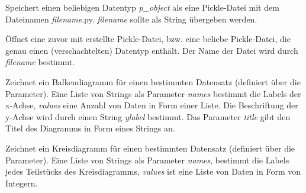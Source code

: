 \documentclass[letterpaper,10pt,english]{sphinxmanual}
\begin{document}
\begin{fulllineitems}
\label{project_3:project_3.save_as_pickle}
Speichert einen beliebigen Datentyp \emph{p\_object} als eine Pickle-Datei mit dem Dateinamen \emph{filename}.py. \emph{filename} sollte als String übergeben werden.

\end{fulllineitems}


\begin{fulllineitems}
\label{project_3:project_3.open_from_pickle}
Öffnet eine zuvor mit {\hyperref[project_3:project_3.save_as_pickle]{}} erstellte Pickle-Datei, bzw. eine beliebe Pickle-Datei, die genau einen (verschachtelten) Datentyp enthält. Der Name der Datei wird durch \emph{filename} bestimmt.

\end{fulllineitems}


\begin{fulllineitems}
\label{project_3:project_3.draw_barchart}
Zeichnet ein Balkendiagramm für einen bestimmten Datensatz (definiert über die Parameter).
Eine Liste von Strings als Parameter \emph{names} bestimmt die Labels der x-Achse, \emph{values} eine Anzahl von Daten in Form einer Liste. Die Beschriftung der y-Achse wird durch einen String \emph{ylabel} bestimmt. Das Parameter \emph{title} gibt den Titel des Diagramms in Form eines Strings an.

\end{fulllineitems}


\begin{fulllineitems}
\label{project_3:project_3.draw_piechart}
Zeichnet ein Kreisdiagramm für einen bestimmten Datensatz (definiert über die Parameter). Eine Liste von Strings als Parameter \emph{names}, bestimmt die Labels jedes Teilstücks des Kreisdiagramms, \emph{values} ist eine Liste von Daten in Form von Integern.

\end{fulllineitems}
\end{document}
